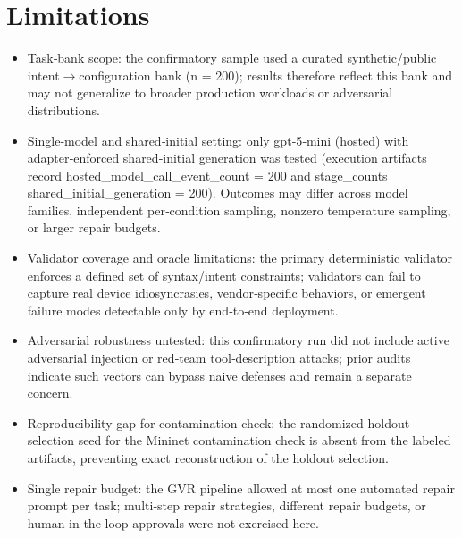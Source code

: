 \documentclass[conference]{IEEEtran}
\begin{document}
\section{Limitations}
\begin{itemize}
\item Task‑bank scope: the confirmatory sample used a curated synthetic/public intent\ensuremath{\rightarrow}configuration bank (n = 200); results therefore reflect this bank and may not generalize to broader production workloads or adversarial distributions.
\item Single‑model and shared‑initial setting: only gpt‑5‑mini (hosted) with adapter‑enforced shared‑initial generation was tested (execution artifacts record hosted\_model\_call\_event\_count = 200 and stage\_counts shared\_initial\_generation = 200). Outcomes may differ across model families, independent per‑condition sampling, nonzero temperature sampling, or larger repair budgets.
\item Validator coverage and oracle limitations: the primary deterministic validator enforces a defined set of syntax/intent constraints; validators can fail to capture real device idiosyncrasies, vendor‑specific behaviors, or emergent failure modes detectable only by end‑to‑end deployment.
\item Adversarial robustness untested: this confirmatory run did not include active adversarial injection or red‑team tool‑description attacks; prior audits indicate such vectors can bypass naive defenses and remain a separate concern.
\item Reproducibility gap for contamination check: the randomized holdout selection seed for the Mininet contamination check is absent from the labeled artifacts, preventing exact reconstruction of the holdout selection.
\item Single repair budget: the GVR pipeline allowed at most one automated repair prompt per task; multi‑step repair strategies, different repair budgets, or human‑in‑the‑loop approvals were not exercised here.
\end{itemize}
\end{document}

